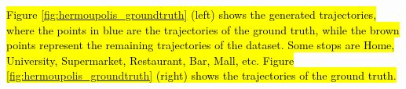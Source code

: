 \documentclass[12pt]{article}
\begin{document}

\hl{Figure {\ref{fig:hermoupolis_groundtruth}} (left) shows the generated trajectories, where the points in blue are the trajectories of the ground truth, while the brown points represent the remaining trajectories of the dataset. Some stops are Home, University, Supermarket, Restaurant, Bar, Mall, etc.
Figure {\ref{fig:hermoupolis_groundtruth}} (right) shows the trajectories of the ground truth.}
\end{document}
